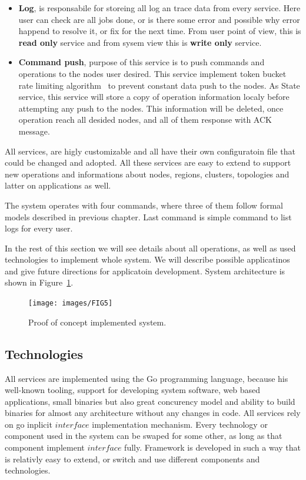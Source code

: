\begin{itemize}
	\item \textbf{Log}, is responsabile for storeing all log an trace data from every service. Here user can check are all jobs done, or is there some error and possible why error happend to resolve it, or fix for the next time. From user point of view, this is \textbf{read only} service and from sysem view this is \textbf{write only} service.
	\item \textbf{Command push}, purpose of this service is to push commands and operations to the nodes user desired. This service implement token bucket rate limiting algorithm~\cite{MathewsKG17} to prevent constant data push to the nodes. As State service, this service will store a copy of operation information localy before attempting any push to the nodes. This information will be deleted, once operation reach all desided nodes, and all of them response with ACK message.
\end{itemize}

All services, are higly customizable and all have their own configuratoin file that could be changed and adopted. All these services are easy to extend to support new operations and informations about nodes, regions, clusters, topologies and latter on applications as well. 

The system operates with four commands, where three of them follow formal models described in previous chapter. Last command is simple command to list logs for every user.

In the rest of this section we will see details about all operations, as well as used technologies to implement whole system. We will describe possible applicatinos and give future directions for applicatoin development. System architecture is shown in Figure~\ref{fig:fig11}.

\begin{figure}[H]
	\begin{center}
		\texttt{[image: images/FIG5]}
	\end{center}
	\vspace{-0.9cm}
	\caption{Proof of concept implemented system.}
	\label{fig:fig11}
\end{figure}
%
%
\subsection{Technologies}\label{sec:technologies}
%
All services are implemented using the Go programming language, because his well-known tooling, support for developing system software, web based applications, small binaries but also great concurency model and ability to build binaries for almost any architecture without any changes in code. All services rely on go inplicit $interface$ implementation mechanism. Every technology or component used in the system can be swaped for some other, as long as that component implement $interface$ fully. Framework is developed in such a way that is relativly easy to extend, or switch and use different components and technologies.


